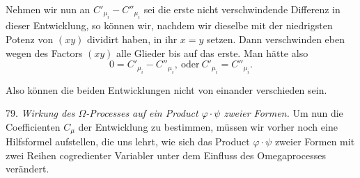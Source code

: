 
Nehmen wir nun an $C'_{\mu_i} - C''_{\mu_i}$ sei die erste nicht verschwindende Differenz in dieser Entwicklung, so können wir, nachdem wir dieselbe mit der niedrigsten Potenz von $(xy)$ dividirt haben, in ihr $x=y$ setzen. Dann verschwinden eben wegen des Factors $(xy)$ alle Glieder bis auf das erste. Man hätte also
\[ 0 = C'_{\mu_i} - C''_{\mu_i}, \ \text{oder} \ C'_{\mu_i} = C''_{\mu_i}. \]

Also können die beiden Entwicklungen nicht von einander verschieden sein.

79. \textit{Wirkung des $\Omega$-Processes auf ein Product $\varphi \cdot \psi$ zweier Formen.} Um nun die Coefficienten $C_\mu$ der Entwicklung zu bestimmen, müssen wir vorher noch eine Hilfsformel aufstellen, die uns lehrt, wie sich das Product $\varphi \cdot \psi$ zweier Formen mit zwei Reihen cogredienter Variabler unter dem Einfluss des Omegaprocesses verändert.

